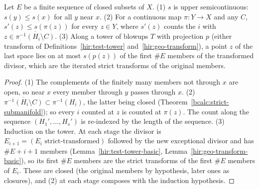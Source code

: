 \begin{lemma}
\label{bcalc:boundary-count}
\mixedleanok
Let \(E\) be a finite sequence of closed subsets of \(X\). (1) \(s\) is upper semicontinuous: \(s(y)\le s(x)\) for all \(y\) near \(x\).
(2) For a continuous map \(\pi\colon Y\to X\) and any \(C\), \(s'(z)\le s(\pi(z))\) for every \(z\in Y\), where \(s'(z)\) counts the
\(i\) with \(z\in\overline{\pi^{-1}(H_i\setminus C)}\).
(3) Along a tower of blowups \(T\) with projection \(p\) (either transform of Definitions~\ref{hir:test-tower} and~\ref{hir:geo-transform}), a
point \(z\) of the last space lies on at most \(s(p(z))\) of the first \(\#E\) members of the transformed divisor, which are the iterated strict
transforms of the original members.
\end{lemma}
\begin{proof}
\mixedleanok
(1) The complements of the finitely many members not through \(x\) are open, so near \(x\) every member through \(y\) passes through \(x\).
(2) \(\overline{\pi^{-1}(H_i\setminus C)}\subset\pi^{-1}(H_i)\), the latter being closed (Theorem~\ref{bcalc:strict-submanifold}); so every \(i\)
counted at \(z\) is counted at \(\pi(z)\). The count along the sequence \((H_1',\dots,H_s')\) is re-indexed by the length of the sequence.
(3) Induction on the tower. At each stage the divisor is \(E_{i+1}=(E_i\text{ strict-transformed})\) followed by the new exceptional divisor
and has \(\#E+i+1\) members (Lemma~\ref{hir:test-tower-basic}, Lemma~\ref{hir:geo-transform-basic}), so its first \(\#E\) members are the strict
transforms of the first \(\#E\) members of \(E_i\). These are closed (the original members by hypothesis, later ones as closures), and (2) at
each stage composes with the induction hypothesis.
\end{proof}

